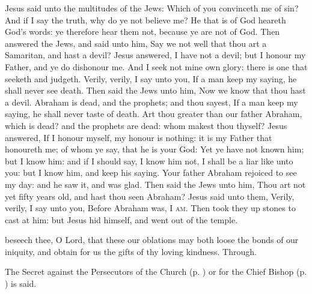 
 Jesus said unto the multitudes of the Jews: Which of you convinceth me of sin? And if I say the truth, why do ye not believe me? He that is of God heareth God's words: ye therefore hear them not, because ye are not of God. Then answered the Jews, and said unto him, Say we not well that thou art a Samaritan, and hast a devil? Jesus answered, I have not a devil; but I honour my Father, and ye do dishonour me. And I seek not mine own glory: there is one that seeketh and judgeth. Verily, verily, I say unto you, If a man keep my saying, he shall never see death. Then said the Jews unto him, Now we know that thou hast a devil. Abraham is dead, and the prophets; and thou sayest, If a man keep my saying, he shall never taste of death. Art thou greater than our father Abraham, which is dead? and the prophets are dead: whom makest thou thyself? Jesus answered, If I honour myself, my honour is nothing: it is my Father that honoureth me; of whom ye say, that he is your God: Yet ye have not known him; but I know him: and if I should say, I know him not, I shall be a liar like unto you: but I know him, and keep his saying. Your father Abraham rejoiced to see my day: and he saw it, and was glad. Then said the Jews unto him, Thou art not yet fifty years old, and hast thou seen Abraham? Jesus said unto them, Verily, verily, I say unto you, Before Abraham was, \textsc{I am}. Then took they up stones to cast at him: but Jesus hid himself, and went out of the temple.

\secret
{} beseech thee, O Lord, that these our oblations may both loose the bonds of our iniquity, and obtain for us the gifts of thy loving kindness. Through.
\begin{rubric}
    The Secret against the Persecutors of the Church (p. \pageref{SPAgainst}) or for the Chief Bishop (p. \pageref{SPChiefBishop}) is said.
\end{rubric}

